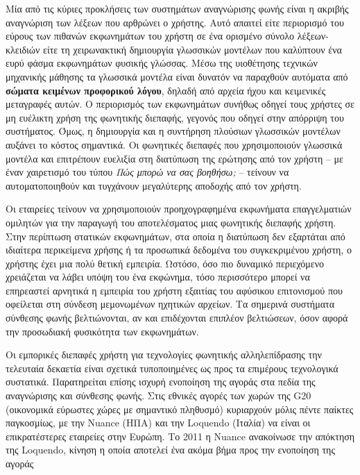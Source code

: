 \documentclass[]{../../metanetpaper}
\begin{document}
\begin{multicols}{2}
Μία από τις κύριες προκλήσεις των συστημάτων αναγνώρισης φωνής είναι η ακριβής αναγνώριση των λέξεων που αρθρώνει ο χρήστης. Αυτό απαιτεί είτε περιορισμό του εύρους των πιθανών εκφωνημάτων του χρήστη σε ένα ορισμένο σύνολο λέξεων-κλειδιών είτε τη χειρωνακτική δημιουργία γλωσσικών μοντέλων που καλύπτουν ένα ευρύ φάσμα εκφωνημάτων φυσικής γλώσσας. Μέσω της υιοθέτησης τεχνικών μηχανικής μάθησης τα γλωσσικά μοντέλα είναι δυνατόν να παραχθούν αυτόματα από  \textbf{σώματα κειμένων προφορικού λόγου}, δηλαδή από αρχεία ήχου και κειμενικές μεταγραφές αυτών. Ο περιορισμός των εκφωνημάτων συνήθως οδηγεί τους χρήστες σε μη ευέλικτη χρήση της φωνητικής διεπαφής, γεγονός που οδηγεί στην απόρριψη του συστήματος. Όμως, η δημιουργία και η συντήρηση πλούσιων γλωσσικών μοντέλων αυξάνει το κόστος σημαντικά. Οι φωνητικές διεπαφές που χρησιμοποιούν γλωσσικά μοντέλα και επιτρέπουν ευελιξία στη διατύπωση της ερώτησης από τον  χρήστη  – με έναν χαιρετισμό  του τύπου \textit{Πώς μπορώ να σας βοηθήσω;} – τείνουν να αυτοματοποιηθούν και τυγχάνουν μεγαλύτερης αποδοχής από τον χρήστη.


Οι εταιρείες τείνουν να χρησιμοποιούν προηχογραφημένα εκφωνήματα επαγγελματιών ομιλητών για την παραγωγή του αποτελέσματος μιας φωνητικής διεπαφής χρήστη. Στην περίπτωση  στατικών εκφωνημάτων, στα οποία η διατύπωση δεν εξαρτάται από ιδιαίτερα περικείμενα χρήσης ή τα προσωπικά δεδομένα του συγκεκριμένου χρήστη, ο χρήστης έχει μια πολύ θετική εμπειρία. Ωστόσο, όσο πιο δυναμικό περιεχόμενο χρειάζεται να λάβει υπόψη του ένα εκφώνημα, τόσο περισσότερο μπορεί να επηρεαστεί αρνητικά η εμπειρία του χρήστη εξαιτίας του αφύσικου επιτονισμού που  οφείλεται στη σύνδεση μεμονωμένων ηχητικών αρχείων. Τα σημερινά συστήματα σύνθεσης φωνής βελτιώνονται, αν και επιδέχονται επιπλέον βελτιώσεων, όσον αφορά την προσωδιακή φυσικότητα των εκφωνημάτων.

Οι εμπορικές διεπαφές χρήστη για τεχνολογίες φωνητικής αλληλεπίδρασης την τελευταία δεκαετία είναι σχετικά τυποποιημένες ως προς τα επιμέρους τεχνολογικά συστατικά. Παρατηρείται επίσης ισχυρή ενοποίηση της αγοράς στα πεδία της αναγνώρισης και σύνθεσης φωνής. Στις εθνικές αγορές των χωρών της G20 (οικονομικά εύρωστες χώρες με σημαντικό πληθυσμό) κυριαρχούν μόλις πέντε παίκτες παγκοσμίως, με την Nuance (ΗΠΑ) και την Loquendo (Ιταλία) να είναι οι επικρατέστερες εταιρείες  στην Ευρώπη. Το 2011 η Nuance ανακοίνωσε την απόκτηση της Loquendo, κίνηση η οποία αποτελεί ένα ακόμα βήμα προς την ενοποίηση της αγοράς


\end{multicols}
\end{document}
